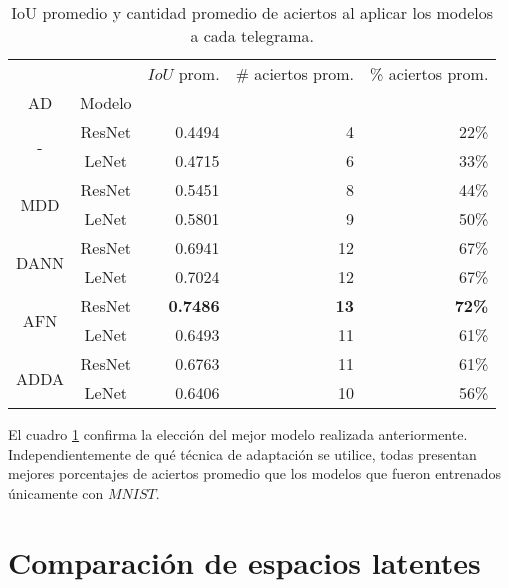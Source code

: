 \begin{table}[H]
    \centering
    \begin{tabular}{cc|rrr}
        \toprule
                                 &        & $IoU$ prom.     & \# aciertos prom. & \% aciertos prom. \\
        AD                       & Modelo &                 &                   &                   \\
        \midrule
        \multirow[c]{2}{*}{-}    & ResNet & 0.4494          & 4                 & 22\%              \\
                                 & LeNet  & 0.4715          & 6                 & 33\%              \\\hline
        \multirow[c]{2}{*}{MDD}  & ResNet & 0.5451          & 8                 & 44\%              \\
                                 & LeNet  & 0.5801          & 9                 & 50\%              \\\hline
        \multirow[c]{2}{*}{DANN} & ResNet & 0.6941          & 12                & 67\%              \\
                                 & LeNet  & 0.7024          & 12                & 67\%              \\\hline
        \multirow[c]{2}{*}{AFN}  & ResNet & \textbf{0.7486} & \textbf{13}       & \textbf{72\%}     \\
                                 & LeNet  & 0.6493          & 11                & 61\%              \\\hline
        \multirow[c]{2}{*}{ADDA} & ResNet & 0.6763          & 11                & 61\%              \\
                                 & LeNet  & 0.6406          & 10                & 56\%              \\
        \bottomrule
    \end{tabular}
    \caption{IoU promedio y cantidad promedio de aciertos al aplicar los modelos a cada telegrama.}
    \label{tab:iou-cant-aciertos-en-telegramas}
\end{table}

El cuadro \ref{tab:iou-cant-aciertos-en-telegramas} confirma la elecci\'on del mejor modelo realizada anteriormente.
Independientemente de qu\'e t\'ecnica de adaptaci\'on se utilice, todas presentan mejores porcentajes de aciertos
promedio que los modelos que fueron entrenados \'unicamente con $MNIST$.

\section{Comparaci\'on de espacios latentes}

